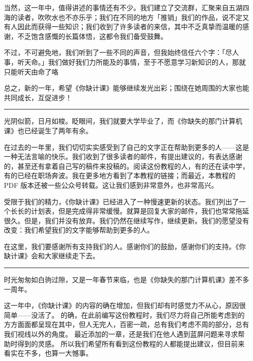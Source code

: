 当然，这一年中，值得讲述的事情还有不少。我们建立了交流群，汇聚来自五湖四海的读者，吹吹水也不亦乐乎；我们在不同的地方「推销」我们的作品，说不定又有人因此而获得一些知识；我们收到了许多读者的来信，其中不乏真挚而温暖的感谢，不乏饱含感慨的长篇体悟，这都令我们备受鼓舞。

不过，不可避免地，我们听到了一些不同的声音，但我始终信任六个字：「尽人事，听天命。」我们做好我们力所能及的事情，至于不愿意学习新知识的人，那就只能听天由命了咯~

总之，新的一年，希望《你缺计课》能够继续发光出彩；围绕在她周围的大家也能共同成长，互促进步！


\begin{center}\rule{0.5\linewidth}{0.5pt}\end{center}

光阴似箭，日月如梭。眨眼间，我们就要大学毕业了，而《你缺失的那门计算机课》也已经诞生了两年有余。

在过去的一年里，我们切切实实感受到了自己的文字正在帮助到更多的人——这是一种无法言喻的快乐。我们收到了很多读者的邮件，有提出建议的，有表达感谢的，甚至还有拿着自己写的稿件来投稿的。阅读这份教程的人，有的还在读中学，有的已经在职场奔波。我在更多地方看到了本教程的链接；而最近，本教程的 PDF 版本还被一些公众号转载。这让我们感到非常意外，也非常高兴。

受限于我们的精力，《你缺计课》已经进入了一种慢速更新的状态。我们列出了一个长长的计划表，但是完成得非常缓慢。就算是回复大家的邮件，我们也常常拖延很久。但是，我们并没有放弃。我们仍然在继续写作，继续更新。我们的愿望没有改变：我们希望我们的文字能够帮助到更多的人。

在这里，我们要感谢所有支持我们的人。感谢你们的鼓励，感谢你们的支持。《你缺计课》会和大家继续走下去。


\begin{center}\rule{0.5\linewidth}{0.5pt}\end{center}

时光匆匆如白驹过隙，又是一年春节来临，也是《你缺失的那门计算机课》差不多一周年。

这一年中，《你缺计课》的内容的确在增加，但我们却有时感觉力不从心，原因很简单——没活了。
的确，在此前编写这份教程时，我们尽力将自己所能考虑到的方方面面都呈现在其中，但人无完人，百密一疏，总有我们考虑不周的部分，总有我们视线以外的角度。
最近添加的一章，还是我们在他人遇到蓝屏问题来寻求帮助时得到的灵感。
所以我们希望所有看到这份教程的人都能提出建议，但目前来看实在不多，也算一大憾事。

